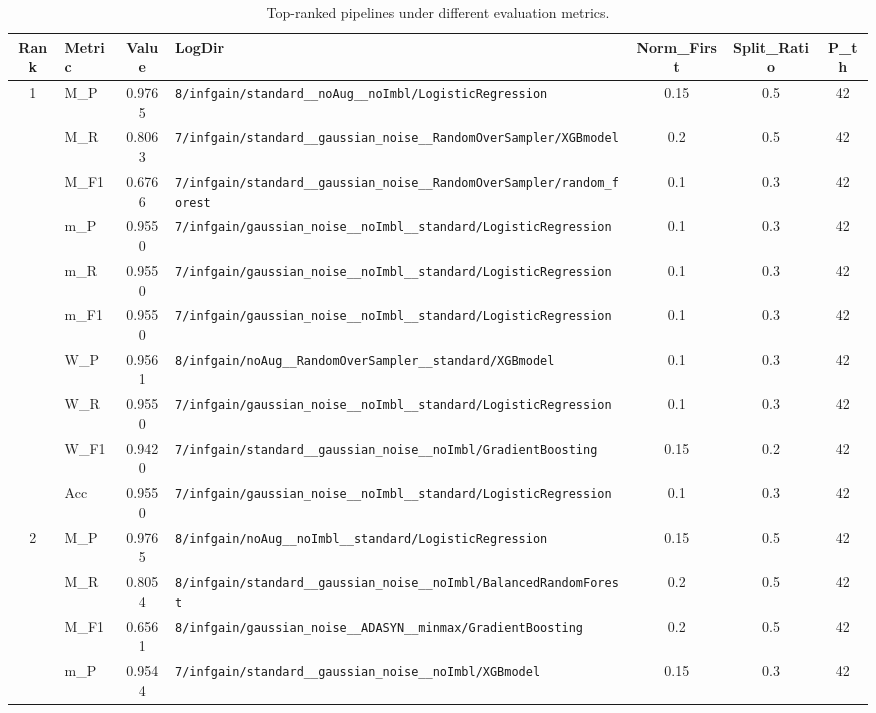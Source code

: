 \begin{table}[htbp]
\caption{Top-ranked pipelines under different evaluation metrics.}
\label{tab:rank_metric_vertical}
\centering
\small
\setlength{\tabcolsep}{4pt}
\begin{tabular}{|c|l|c|>{\ttfamily\footnotesize}p{7.2cm}|c|c|c|}
\hline
Rank & Metric & Value & LogDir & Norm\_First & Split\_Ratio & P\_th \\
\hline
\multirow{10}{*}{1} & M\_P & 0.9765 & \texttt{8/infgain/standard\_\_noAug\_\_noImbl/LogisticRegression} & 0.15 & 0.5  & 42 \\ 
 & M\_R & 0.8063 & \texttt{7/infgain/standard\_\_gaussian\_noise\_\_RandomOverSampler/XGBmodel} & 0.2 & 0.5  & 42 \\ 
 & M\_F1 & 0.6766 & \texttt{7/infgain/standard\_\_gaussian\_noise\_\_RandomOverSampler/random\_forest} & 0.1 & 0.3  & 42 \\ 
 & m\_P & 0.9550 & \texttt{7/infgain/gaussian\_noise\_\_noImbl\_\_standard/LogisticRegression} & 0.1 & 0.3  & 42 \\ 
 & m\_R & 0.9550 & \texttt{7/infgain/gaussian\_noise\_\_noImbl\_\_standard/LogisticRegression} & 0.1 & 0.3  & 42 \\ 
 & m\_F1 & 0.9550 & \texttt{7/infgain/gaussian\_noise\_\_noImbl\_\_standard/LogisticRegression} & 0.1 & 0.3  & 42 \\ 
 & W\_P & 0.9561 & \texttt{8/infgain/noAug\_\_RandomOverSampler\_\_standard/XGBmodel} & 0.1 & 0.3  & 42 \\ 
 & W\_R & 0.9550 & \texttt{7/infgain/gaussian\_noise\_\_noImbl\_\_standard/LogisticRegression} & 0.1 & 0.3  & 42 \\ 
 & W\_F1 & 0.9420 & \texttt{7/infgain/standard\_\_gaussian\_noise\_\_noImbl/GradientBoosting} & 0.15 & 0.2  & 42 \\ 
 & Acc & 0.9550 & \texttt{7/infgain/gaussian\_noise\_\_noImbl\_\_standard/LogisticRegression} & 0.1 & 0.3  & 42 \\ 
\hline
\multirow{10}{*}{2} & M\_P & 0.9765 & \texttt{8/infgain/noAug\_\_noImbl\_\_standard/LogisticRegression} & 0.15 & 0.5  & 42 \\ 
 & M\_R & 0.8054 & \texttt{8/infgain/standard\_\_gaussian\_noise\_\_noImbl/BalancedRandomForest} & 0.2 & 0.5  & 42 \\ 
 & M\_F1 & 0.6561 & \texttt{8/infgain/gaussian\_noise\_\_ADASYN\_\_minmax/GradientBoosting} & 0.2 & 0.5  & 42 \\ 
 & m\_P & 0.9544 & \texttt{7/infgain/standard\_\_gaussian\_noise\_\_noImbl/XGBmodel} & 0.15 & 0.3  & 42 \\ 

\end{tabular}
\end{table}

